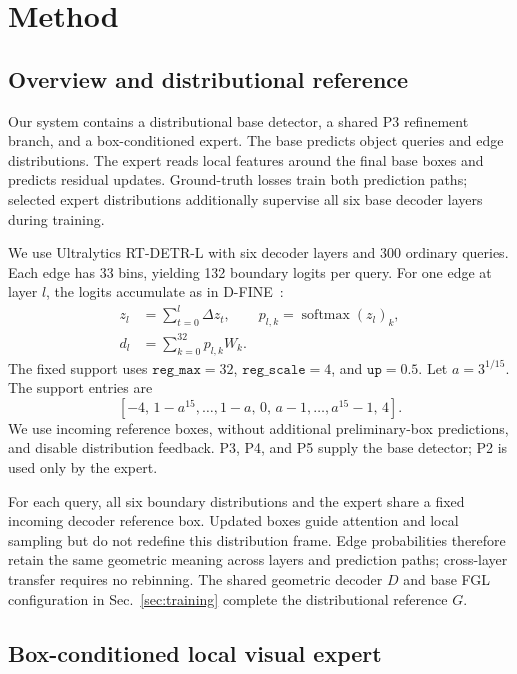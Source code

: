 \section{Method}
\subsection{Overview and distributional reference}
Our system contains a distributional base detector, a shared P3 refinement branch, and a box-conditioned expert. The base predicts object queries and edge distributions. The expert reads local features around the final base boxes and predicts residual updates. Ground-truth losses train both prediction paths; selected expert distributions additionally supervise all six base decoder layers during training.

We use Ultralytics RT-DETR-L with six decoder layers and 300 ordinary queries. Each edge has 33 bins, yielding 132 boundary logits per query. For one edge at layer $l$, the logits accumulate as in D-FINE~\cite{peng2025dfine}:
\begin{equation}
\begin{aligned}
z_l&=\sum_{t=0}^{l}\Delta z_t,\qquad
p_{l,k}=\operatorname{softmax}(z_l)_k,\\
d_l&=\sum_{k=0}^{32}p_{l,k}W_k .
\end{aligned}
\label{eq:distribution}
\end{equation}
The fixed support uses $\texttt{reg\_max}=32$, $\texttt{reg\_scale}=4$, and $\texttt{up}=0.5$. Let $a=3^{1/15}$. The support entries are
\[
[-4,\,1-a^{15},\ldots,1-a,\,0,\,a-1,\ldots,a^{15}-1,\,4].
\]
We use incoming reference boxes, without additional preliminary-box predictions, and disable distribution feedback. P3, P4, and P5 supply the base detector; P2 is used only by the expert.

For each query, all six boundary distributions and the expert share a fixed incoming decoder reference box. Updated boxes guide attention and local sampling but do not redefine this distribution frame. Edge probabilities therefore retain the same geometric meaning across layers and prediction paths; cross-layer transfer requires no rebinning. The shared geometric decoder $D$ and base FGL configuration in Sec.~\ref{sec:training} complete the distributional reference $G$.


\subsection{Box-conditioned local visual expert}

